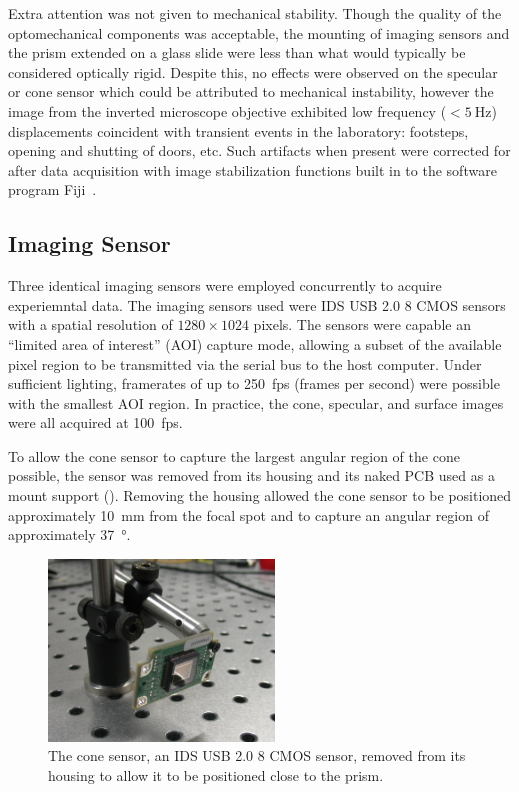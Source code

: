 Extra attention was not given to mechanical stability.  Though the quality of
the optomechanical components was acceptable, the mounting of imaging sensors
and the prism extended on a glass slide were less than what would
typically be considered optically rigid.  Despite this, no effects were
observed on the specular or cone sensor which could be attributed to
mechanical instability, however the image from the inverted microscope
objective exhibited low frequency ($<\SI{5}{\hertz}$) displacements coincident
with transient events in the laboratory: footsteps, opening and shutting of
doors, etc.  Such artifacts when present were corrected for after data
acquisition with image stabilization functions built in to the software
program Fiji~\cite{schindelin2012fiji}.

\subsection{Imaging Sensor}
Three identical imaging sensors were employed concurrently to acquire
experiemntal data.  The imaging sensors used were IDS USB 2.0 \SI{8}{\bit}
CMOS sensors with a spatial resolution of $1280\times1024$ pixels.  The
sensors were capable an ``limited area of interest'' (AOI) capture mode,
allowing a subset of the available pixel region to be transmitted via the
serial bus to the host computer.  Under sufficient lighting, framerates of
up to \SI{250}{fps} (frames per second) were possible with the smallest AOI
region.  In practice, the cone, specular, and surface images were all
acquired at \SI{100}{fps}.

To allow the cone sensor to capture the largest angular region of the cone
possible, the sensor was removed from its housing and its naked PCB used as
a mount support ().  Removing the housing allowed
the cone sensor to be positioned approximately \SI{10}{\milli\meter} from
the focal spot and to capture an angular region of approximately
\SI{37}{\degree}.
\begin{figure}[ht]
 \centering
 \includegraphics[width=6cm,keepaspectratio]{experimental/figures/nakedsensorcrop.jpg}
\caption{The cone sensor, an IDS USB 2.0 \SI{8}{\bit} CMOS sensor, removed from its housing to allow it to be positioned close to the prism.}
\label{fig:imagingsensor}
\end{figure}

